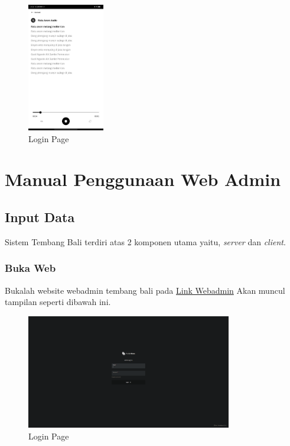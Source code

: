 \begin{figure}[H]
    \centering
    \includegraphics[width=0.3\textwidth]{assets/lyric.jpg}
    \caption{Login Page}
\end{figure}

\section{Manual Penggunaan Web Admin}

\subsection{Input Data}
Sistem Tembang Bali terdiri atas 2 komponen utama yaitu, \textit{server} dan \textit{client}.

\subsubsection{Buka Web}
Bukalah website webadmin tembang bali pada \href{https://tembang.fuwuna.tech/_}{Link Webadmin}
Akan muncul tampilan seperti dibawah ini.

\begin{figure}[H]
    \centering
    \includegraphics[width=0.8\textwidth]{assets/webview.png}
    \caption{Login Page}
\end{figure}

